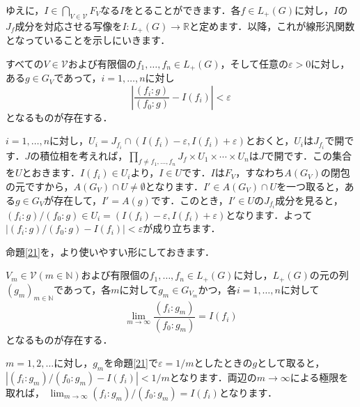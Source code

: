 ゆえに，$I \in \bigcap_{V \in \mathscr{V}}F_V$なる$I$をとることができます．各$f \in L_{+}(G)$に対し，$I$の$J_f$成分を対応させる写像を$I \colon L_{+}(G) \to \mathbb{R}$と定めます．以降，これが線形汎関数となっていることを示しにいきます．
\begin{yprop}\label{21}
すべての$V \in \mathscr{V}$および有限個の$f_1, \ldots , f_n \in L_{+}(G)$，そして任意の$\varepsilon > 0$に対し，ある$g \in G_V$であって，$i=1, \ldots , n$に対し
\[
\left\lvert \frac{(f_i : g )}{( f_0 : g )} -I(f_i) \right\rvert < \varepsilon
\]
となるものが存在する．
\end{yprop}
\begin{Proof}
$i=1, \ldots , n$に対し，$U_i=J_{f_i} \cap ( I(f_i)- \varepsilon, I(f_i)+\varepsilon )$とおくと，$U_i$は$J_{f_i}$で開です．$J$の積位相を考えれば，$\prod_{f \neq f_1, \ldots , f_n}J_f \times U_1 \times \cdots \times U_n$は$J$で開です．この集合を$U$とおきます．$I(f_i) \in U_i$より，$I \in U$です．$I$は$F_V$，すなわち$A(G_V)$の閉包の元ですから，$A(G_V) \cap U \neq \emptyset$となります．$I' \in A(G_V) \cap U$を一つ取ると，ある$g \in G_V$が存在して，$I'=A(g)$です．このとき，$I' \in U$の$J_{f_i}$成分を見ると，$(f_i : g ) / ( f_0 : g ) \in U_i = ( I(f_i)- \varepsilon, I(f_i)+\varepsilon )$となります．よって$|(f_i : g ) / ( f_0 : g ) -I(f_i) | < \varepsilon$が成り立ちます．
\end{Proof}
命題\ref{21}を，より使いやすい形にしておきます．

\begin{ycor}\label{22}
$V_m \in \mathscr{V}(m \in \mathbb{N})$および有限個の$f_1, \ldots , f_n \in L_{+}(G)$に対し，$L_{+}(G)$の元の列$(g_m)_{m \in \mathbb{N}}$であって，各$m$に対して$g_m \in G_{V_m}$かつ，各$i=1, \ldots , n$に対して 
\[
\lim_{m \to \infty} \frac{(f_i : g_m )}{( f_0 : g_m )} =I(f_i)
\]
となるものが存在する．
\end{ycor}
\begin{Proof}
$m=1,2, \ldots$に対し，$g_m$を命題\ref{21}で$\varepsilon = 1/m$としたときの$g$として取ると，$|(f_i : g_m ) / ( f_0 : g_m ) -I(f_i) | < 1/m$となります．両辺の$m \to \infty$による極限を取れば， $\lim_{m \to \infty} (f_i : g_m ) / ( f_0 : g_m ) =I(f_i)$となります．　
\end{Proof}

